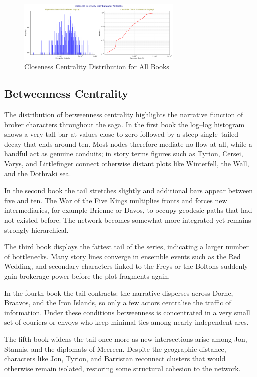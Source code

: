 \documentclass[12pt, a4paper]{article}
\begin{document}
\begin{figure}[htbp]
      \centering
      \includegraphics[width=0.7\textwidth]{closeness-distrib-all-books.png}
      \caption{Closeness Centrality Distribution for All Books}
      \label{fig:closeness-distrib}
\end{figure}

\subsection*{Betweenness Centrality}
The distribution of betweenness centrality highlights the narrative function of broker characters throughout the saga. In the first book the log–log histogram shows a very tall bar at values close to zero followed by a steep single–tailed decay that ends around ten. Most nodes therefore mediate no flow at all, while a handful act as genuine conduits; in story terms figures such as Tyrion, Cersei, Varys, and Littlefinger connect otherwise distant plots like Winterfell, the Wall, and the Dothraki sea.

In the second book the tail stretches slightly and additional bars appear between five and ten. The War of the Five Kings multiplies fronts and forces new intermediaries, for example Brienne or Davos, to occupy geodesic paths that had not existed before. The network becomes somewhat more integrated yet remains strongly hierarchical.

The third book displays the fattest tail of the series, indicating a larger number of bottlenecks. Many story lines converge in ensemble events such as the Red Wedding, and secondary characters linked to the Freys or the Boltons suddenly gain brokerage power before the plot fragments again.

In the fourth book the tail contracts: the narrative disperses across Dorne, Braavos, and the Iron Islands, so only a few actors centralise the traffic of information. Under these conditions betweenness is concentrated in a very small set of couriers or envoys who keep minimal ties among nearly independent arcs.

The fifth book widens the tail once more as new intersections arise among Jon, Stannis, and the diplomats of Meereen. Despite the geographic distance, characters like Jon, Tyrion, and Barristan reconnect clusters that would otherwise remain isolated, restoring some structural cohesion to the network.
\end{document}
